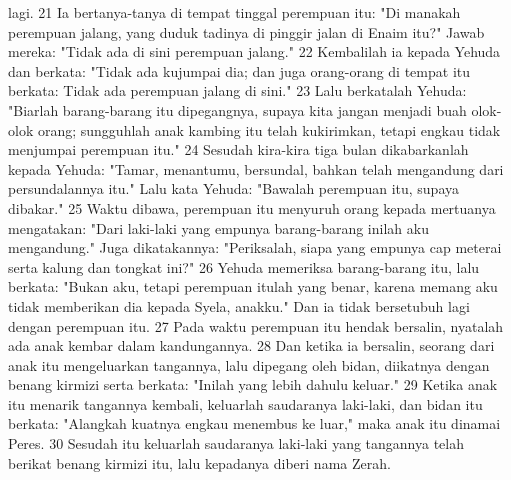 \begin{biblechapter}
lagi. 21 Ia bertanya-tanya di tempat tinggal perempuan itu: "Di manakah perempuan jalang, yang duduk tadinya di pinggir jalan di Enaim itu?" Jawab mereka: "Tidak ada di sini perempuan jalang." 22 Kembalilah ia kepada Yehuda dan berkata: "Tidak ada kujumpai dia; dan juga orang-orang di tempat itu berkata: Tidak ada perempuan jalang di sini." 23 Lalu berkatalah Yehuda: "Biarlah barang-barang itu dipegangnya, supaya kita jangan menjadi buah olok-olok orang; sungguhlah anak kambing itu telah kukirimkan, tetapi engkau tidak menjumpai perempuan itu." 24 Sesudah kira-kira tiga bulan dikabarkanlah kepada Yehuda: "Tamar, menantumu, bersundal, bahkan telah mengandung dari persundalannya itu." Lalu kata Yehuda: "Bawalah perempuan itu, supaya dibakar." 25 Waktu dibawa, perempuan itu menyuruh orang kepada mertuanya mengatakan: "Dari laki-laki yang empunya barang-barang inilah aku mengandung." Juga dikatakannya: "Periksalah, siapa yang empunya cap meterai serta kalung dan tongkat ini?" 26 Yehuda memeriksa barang-barang itu, lalu berkata: "Bukan aku, tetapi perempuan itulah yang benar, karena memang aku tidak memberikan dia kepada Syela, anakku." Dan ia tidak bersetubuh lagi dengan perempuan itu. 27 Pada waktu perempuan itu hendak bersalin, nyatalah ada anak kembar dalam kandungannya. 28 Dan ketika ia bersalin, seorang dari anak itu mengeluarkan tangannya, lalu dipegang oleh bidan, diikatnya dengan benang kirmizi serta berkata: "Inilah yang lebih dahulu keluar." 29 Ketika anak itu menarik tangannya kembali, keluarlah saudaranya laki-laki, dan bidan itu berkata: "Alangkah kuatnya engkau menembus ke luar," maka anak itu dinamai Peres. 30 Sesudah itu keluarlah saudaranya laki-laki yang tangannya telah berikat benang kirmizi itu, lalu kepadanya diberi nama Zerah.
\end{biblechapter}

